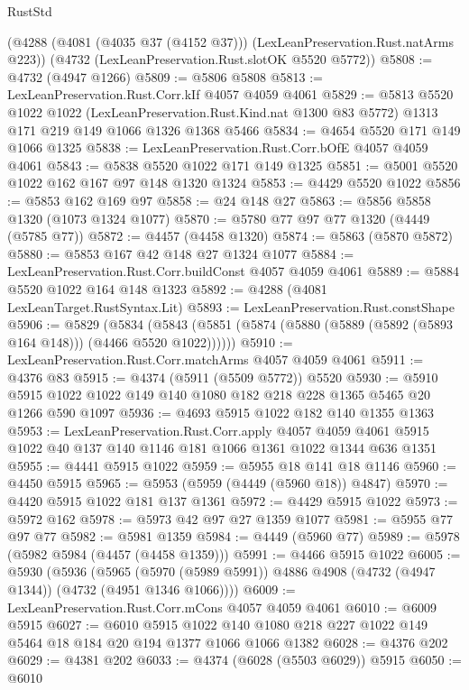 \begin{lexlean}{RustStd}
\begin{coremodule}
{\begin{coremodule}
{{{{{{{{{{{{{{    (@4288 (@4081 (@4035 @37 (@4152 @37))) (LexLeanPreservation.Rust.natArms @223))
    (@4732 (LexLeanPreservation.Rust.slotOK @5520 @5772))
@5808 := @4732 (@4947 @1266)
@5809 := @5806 @5808
@5813 := LexLeanPreservation.Rust.Corr.kIf @4057 @4059 @4061
@5829 := @5813
    @5520
    @1022
    @1022
    (LexLeanPreservation.Rust.Kind.nat @1300 @83 @5772)
    @1313
    @171
    @219
    @149
    @1066
    @1326
    @1368
    @5466
@5834 := @4654 @5520 @171 @149 @1066 @1325
@5838 := LexLeanPreservation.Rust.Corr.bOfE @4057 @4059 @4061
@5843 := @5838 @5520 @1022 @171 @149 @1325
@5851 := @5001 @5520 @1022 @162 @167 @97 @148 @1320 @1324
@5853 := @4429 @5520 @1022
@5856 := @5853 @162 @169 @97
@5858 := @24 @148 @27
@5863 := @5856 @5858 @1320 (@1073 @1324 @1077)
@5870 := @5780 @77 @97 @77 @1320 (@4449 (@5785 @77))
@5872 := @4457 (@4458 @1320)
@5874 := @5863 (@5870 @5872)
@5880 := @5853 @167 @42 @148 @27 @1324 @1077
@5884 := LexLeanPreservation.Rust.Corr.buildConst @4057 @4059 @4061
@5889 := @5884 @5520 @1022 @164 @148 @1323
@5892 := @4288 (@4081 LexLeanTarget.RustSyntax.Lit)
@5893 := LexLeanPreservation.Rust.constShape
@5906 := @5829
    (@5834 (@5843 (@5851 (@5874 (@5880 (@5889 (@5892 (@5893 @164 @148))) (@4466 @5520 @1022))))))
@5910 := LexLeanPreservation.Rust.Corr.matchArms @4057 @4059 @4061
@5911 := @4376 @83
@5915 := @4374 (@5911 (@5509 @5772)) @5520
@5930 := @5910 @5915 @1022 @1022 @149 @140 @1080 @182 @218 @228 @1365 @5465 @20 @1266 @590 @1097
@5936 := @4693 @5915 @1022 @182 @140 @1355 @1363
@5953 := LexLeanPreservation.Rust.Corr.apply
    @4057
    @4059
    @4061
    @5915
    @1022
    @40
    @137
    @140
    @1146
    @181
    @1066
    @1361
    @1022
    @1344
    @636
    @1351
@5955 := @4441 @5915 @1022
@5959 := @5955 @18 @141 @18 @1146
@5960 := @4450 @5915
@5965 := @5953 (@5959 (@4449 (@5960 @18)) @4847)
@5970 := @4420 @5915 @1022 @181 @137 @1361
@5972 := @4429 @5915 @1022
@5973 := @5972 @162
@5978 := @5973 @42 @97 @27 @1359 @1077
@5981 := @5955 @77 @97 @77
@5982 := @5981 @1359
@5984 := @4449 (@5960 @77)
@5989 := @5978 (@5982 @5984 (@4457 (@4458 @1359)))
@5991 := @4466 @5915 @1022
@6005 := @5930
    (@5936
      (@5965 (@5970 (@5989 @5991)) @4886 @4908 (@4732 (@4947 @1344)) (@4732 (@4951 @1346 @1066))))
@6009 := LexLeanPreservation.Rust.Corr.mCons @4057 @4059 @4061
@6010 := @6009 @5915
@6027 := @6010
    @5915
    @1022
    @140
    @1080
    @218
    @227
    @1022
    @149
    @5464
    @18
    @184
    @20
    @194
    @1377
    @1066
    @1066
    @1382
@6028 := @4376 @202
@6029 := @4381 @202
@6033 := @4374 (@6028 (@5503 @6029)) @5915
@6050 := @6010
}}}}}}}}}}}}}}
\end{coremodule}}
\end{coremodule}
\end{lexlean}
